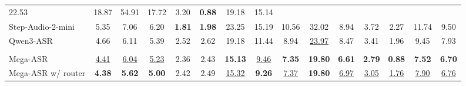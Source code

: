 \documentclass{article}
\begin{document}
\begin{table}[t]
\begin{tabular}{lcccccccccccccc}
22.53 &
18.87 &
54.91 &
17.72 &
3.20 &
\textbf{0.88} &
19.18 &
15.14 \\
Step-Audio-2-mini &
5.35 &
7.06 &
6.20 &
\textbf{1.81} &
\textbf{1.98} &
23.25 &
15.19 &
10.56 &
32.02 &
8.94 &
3.72 &
2.27 &
11.74 &
9.50 \\
Qwen3-ASR &
4.66 &
6.11 &
5.39 &
2.52 &
2.62 &
19.18 &
11.44 &
8.94 &
\underline{23.97} &
8.47 &
3.41 &
1.96 &
9.45 &
7.93 \\
\rowcolor{headerblue}
\multicolumn{15}{l}{\textit{Our model}} \\
Mega-ASR &
\underline{4.41} &
\underline{6.04} &
\underline{5.23} &
2.36 &
2.43 &
\textbf{15.13} &
\underline{9.46} &
\textbf{7.35} &
\textbf{19.80} &
\textbf{6.61} &
\textbf{2.79} &
\textbf{0.88} &
\textbf{7.52} &
\textbf{6.70} \\
Mega-ASR w/ router &
\textbf{4.38} &
\textbf{5.62} &
\textbf{5.00} &
2.42 &
2.49 &
\underline{15.32} &
\textbf{9.26} &
\underline{7.37} &
\textbf{19.80} &
\underline{6.97} &
\underline{3.05} &
\underline{1.76} &
\underline{7.90} &
\underline{6.76} \\
\bottomrule
\end{tabular}










\end{table}
\end{document}
